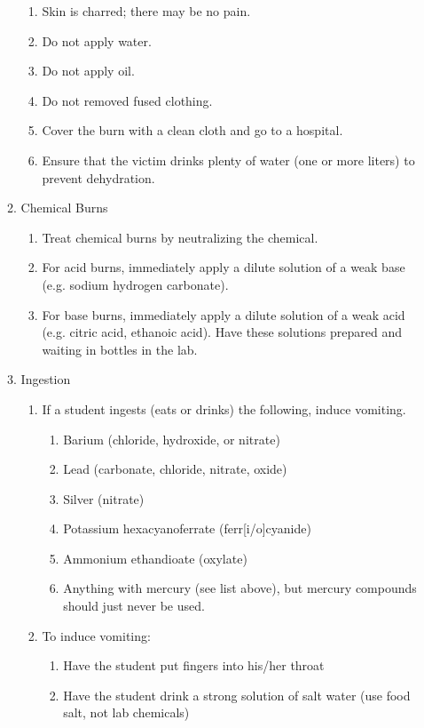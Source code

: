 \begin{enumerate}
\begin{enumerate}
\begin{enumerate}
\item{Skin is charred; there may be no pain.}
\item{Do not apply water.}
\item{Do not apply oil.}
\item{Do not removed fused clothing.}
\item{Cover the burn with a clean cloth and go to a hospital.}
\item{Ensure that the victim drinks plenty of water (one or more liters) 
to prevent dehydration.}
\end{enumerate}

\item{Chemical Burns}

\begin{enumerate}
\item{Treat chemical burns by neutralizing the chemical.}
\item{For acid burns, immediately apply a dilute solution of a weak base 
(e.g. sodium hydrogen carbonate).}
\item{For base burns, immediately apply a dilute solution of a weak acid 
(e.g. citric acid, ethanoic acid). 
Have these solutions prepared and waiting in bottles in the lab.}
\end{enumerate}

\item{Ingestion}
\begin{enumerate}

\item{If a student ingests (eats or drinks) the following, induce vomiting.}
\begin{enumerate}
\item{Barium (chloride, hydroxide, or nitrate)}
\item{Lead (carbonate, chloride, nitrate, oxide)}
\item{Silver (nitrate)}
\item{Potassium hexacyanoferrate (ferr[i/o]cyanide)}
\item{Ammonium ethandioate (oxylate)}
\item{Anything with mercury (see list above), 
but mercury compounds should just never be used.}
\end{enumerate}

\item{To induce vomiting:}
\begin{enumerate}
\item{Have the student put fingers into his/her throat}
\item{Have the student drink a strong solution of salt water 
(use food salt, not lab chemicals)}
\end{enumerate}


\end{enumerate}
\end{enumerate}
\end{enumerate}
